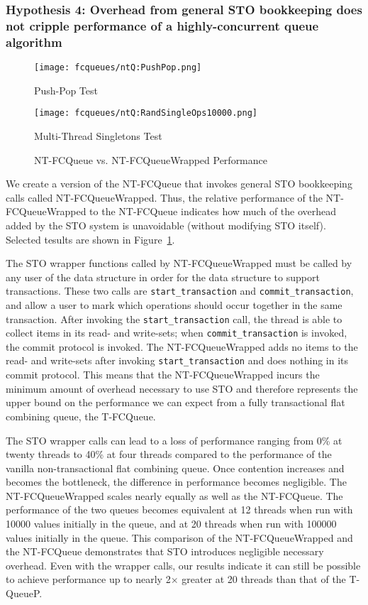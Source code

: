 \subsubsection{Hypothesis 4: Overhead from general STO bookkeeping does not cripple performance of a highly-concurrent queue algorithm}

\begin{figure}[t]
    \centering
	\begin{minipage}{0.45\textwidth}
	    \texttt{[image: fcqueues/ntQ:PushPop.png]}
        \caption*{Push-Pop Test}
	\end{minipage}
   	\begin{minipage}{0.45\textwidth}
	    \texttt{[image: fcqueues/ntQ:RandSingleOps10000.png]}
        \caption*{Multi-Thread Singletons Test}
	\end{minipage}
        \caption{NT-FCQueue vs. NT-FCQueueWrapped Performance}
    \label{fig:wrappedqs}
\end{figure}

We create a version of the NT-FCQueue that invokes general STO bookkeeping calls called NT-FCQueueWrapped. Thus, the relative performance of the NT-FCQueueWrapped to the NT-FCQueue indicates how much of the overhead added by the STO system is unavoidable (without modifying STO itself). 
Selected tesults are shown in Figure~\ref{fig:wrappedqs}.

The STO wrapper functions called by NT-FCQueueWrapped must be called by any user of the data structure in order for the data structure to support transactions.
These two calls are \texttt{start\_transaction} and \texttt{commit\_transaction}, and allow a user to mark which operations should occur together in the same transaction. After invoking the \texttt{start\_transaction} call, the thread is able to collect items in its read- and write-sets; when \texttt{commit\_transaction} is invoked, the commit protocol is invoked. The NT-FCQueueWrapped adds no items to the read- and write-sets after invoking \texttt{start\_transaction} and does nothing in its commit protocol. This means that the NT-FCQueueWrapped incurs the minimum amount of overhead necessary to use STO and therefore represents the upper bound on the performance we can expect from a fully transactional flat combining queue, the T-FCQueue. 

The STO wrapper calls can lead to a loss of performance ranging from 0\% at twenty threads to 40\% at four threads compared to the performance of the vanilla non-transactional flat combining queue. Once contention increases and becomes the bottleneck, the difference in performance becomes negligible. The NT-FCQueueWrapped scales nearly equally as well as the NT-FCQueue. The performance of the two queues becomes equivalent at 12 threads when run with 10000 values initially in the queue, and at 20 threads when run with 100000 values initially in the queue. This comparison of the NT-FCQueueWrapped and the NT-FCQueue demonstrates that STO introduces negligible necessary overhead. Even with the wrapper calls, our results indicate it can still be possible to achieve performance up to nearly 2$\times$ greater at 20 threads than that of the T-QueueP.

